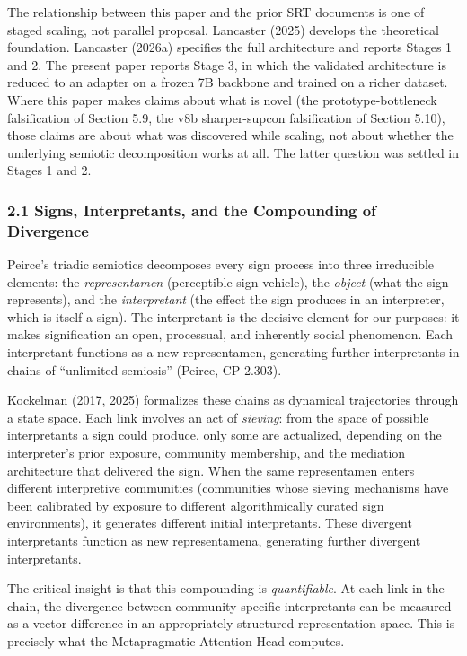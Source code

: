 \documentclass[
  11pt]{article}
\begin{document}
The relationship between this paper and the prior SRT documents is one
of staged scaling, not parallel proposal. Lancaster (2025) develops the
theoretical foundation. Lancaster (2026a) specifies the full
architecture and reports Stages 1 and 2. The present paper reports Stage
3, in which the validated architecture is reduced to an adapter on a
frozen 7B backbone and trained on a richer dataset. Where this paper
makes claims about what is novel (the prototype-bottleneck falsification
of Section 5.9, the v8b sharper-supcon falsification of Section 5.10),
those claims are about what was discovered while scaling, not about
whether the underlying semiotic decomposition works at all. The latter
question was settled in Stages 1 and 2.

\subsubsection{2.1 Signs, Interpretants, and the Compounding of
Divergence}\label{signs-interpretants-and-the-compounding-of-divergence}

Peirce's triadic semiotics decomposes every sign process into three
irreducible elements: the \emph{representamen} (perceptible sign
vehicle), the \emph{object} (what the sign represents), and the
\emph{interpretant} (the effect the sign produces in an interpreter,
which is itself a sign). The interpretant is the decisive element for
our purposes: it makes signification an open, processual, and inherently
social phenomenon. Each interpretant functions as a new representamen,
generating further interpretants in chains of ``unlimited semiosis''
(Peirce, CP 2.303).

Kockelman (2017, 2025) formalizes these chains as dynamical trajectories
through a state space. Each link involves an act of \emph{sieving}: from
the space of possible interpretants a sign could produce, only some are
actualized, depending on the interpreter's prior exposure, community
membership, and the mediation architecture that delivered the sign. When
the same representamen enters different interpretive communities
(communities whose sieving mechanisms have been calibrated by exposure
to different algorithmically curated sign environments), it generates
different initial interpretants. These divergent interpretants function
as new representamena, generating further divergent interpretants.

The critical insight is that this compounding is \emph{quantifiable}. At
each link in the chain, the divergence between community-specific
interpretants can be measured as a vector difference in an appropriately
structured representation space. This is precisely what the
Metapragmatic Attention Head computes.
\end{document}
